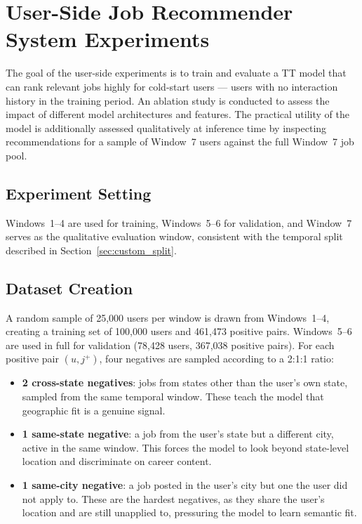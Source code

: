 \section{User-Side Job Recommender System Experiments}
\label{sec:exp_user}
The goal of the user-side experiments is to train and evaluate a 
\gls{TT} model that can rank relevant jobs highly for cold-start users 
--- users with no interaction history in the training period.  An ablation study is conducted to assess the impact of different model architectures and features. The practical 
utility of the model is additionally assessed qualitatively at inference 
time by inspecting recommendations for a sample of Window~7 users against 
the full Window~7 job pool.

\subsection{Experiment Setting}
\label{sec:exp_user_setting}

Windows~1--4 are used for training, Windows~5--6 for validation, and 
Window~7 serves as the qualitative evaluation window, consistent with 
the temporal split described in Section~\ref{sec:custom_split}.
\subsection{Dataset Creation}
\label{sec:exp_user_datagen}
A random sample of 25,000 users per window is drawn from Windows~1--4, 
creating a training set of 100,000 users and 461,473 positive pairs. 
Windows~5--6 are used in full for validation (78,428 users, 367,038 
positive pairs). For each positive pair $(u,j^+)$, four negatives are sampled according 
to a 2:1:1 ratio:
\begin{itemize}
    \item \textbf{2 cross-state negatives}: jobs from states other than the user's own state, sampled from the same temporal window. These teach the model that geographic fit is a genuine signal.
    \item \textbf{1 same-state negative}: a job from the user's state but a different city, active in the same window. This forces the model to look beyond state-level location and discriminate on career content.
    \item \textbf{1 same-city negative}: a job posted in the user's city but one the user did not apply to. These are the hardest negatives, as they share the user's location and are still unapplied to, pressuring the model to learn semantic fit.
\end{itemize}
 
